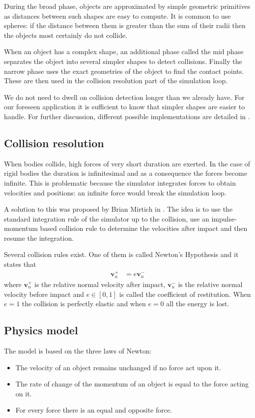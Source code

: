 During the broad phase, objects are approximated by simple geometric primitives as distances between such shapes are easy to compute. It is common to use spheres: if the distance between them is greater than the sum of their radii then the objects most certainly do not collide.

When an object has a complex shape, an additional phase called the mid phase separates the object into several simpler shapes to detect collisions. Finally the narrow phase uses the exact geometries of the object to find the contact points. These are then used in the collision resolution part of the simulation loop.

We do not need to dwell on collision detection longer than we already have. For our foreseen application it is sufficient to know that simpler shapes are easier to handle. For further discussion, different possible implementations are detailed in \cite{jimenez20013d}.

\subsection{Collision resolution \label{sec:contact}}
When bodies collide, high forces of very short duration are exerted. In the case of rigid bodies the duration is infinitesimal and as a consequence the forces become infinite. This is problematic because the simulator integrates forces to obtain velocities and positions: an infinite force would break the simulation loop.

A solution to this was proposed by Brian Mirtich in \cite{mirtich1996impulse}. The idea is to use the standard integration rule of the simulator up to the collision, use an impulse-momentum based collision rule to determine the velocities after impact and then resume the integration.

Several collision rules exist. One of them is called Newton's Hypothesis and it states that
\begin{align*}
	\mathbf{v}_n^+ & = e\mathbf{v}_n^-
\end{align*}
where $\mathbf{v}_n^+$ is the relative normal velocity after impact, $\mathbf{v}_n^-$ is the relative normal velocity before impact and $e \in [0, 1]$ is called the coefficient of restitution. When $e=1$ the collision is perfectly elastic and when $e=0$ all the energy is lost.

\subsection{Physics model}
The model is based on the three laws of Newton:
\begin{itemize}
	\item The velocity of an object remains unchanged if no force act upon it.
	\item The rate of change of the momentum of an object is equal to the force acting on it.
	\item For every force there is an equal and opposite force.
\end{itemize}

